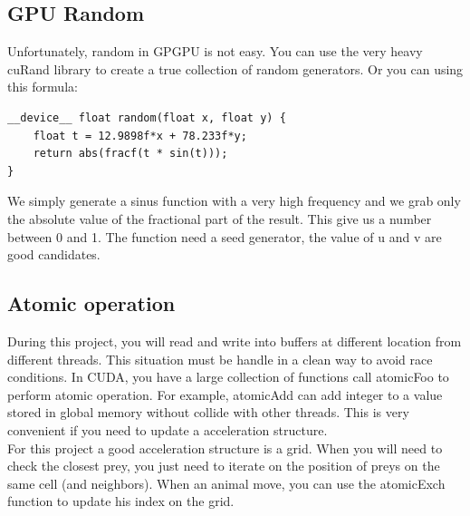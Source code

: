 \documentclass{article}
\begin{document}
\subsection{GPU Random}
Unfortunately, random in GPGPU is not easy. You can use the very heavy cuRand library to create a true collection of random generators. Or you can using this formula:
\begin{lstlisting}
__device__ float random(float x, float y) {
	float t = 12.9898f*x + 78.233f*y;
	return abs(fracf(t * sin(t)));
}
\end{lstlisting}
We simply generate a sinus function with a very high frequency and we grab only the absolute value of the fractional part of the result. This give us a number between 0 and 1. The function need a seed generator, the value of u and v are good candidates.

\subsection{Atomic operation}
During this project, you will read and write into buffers at different location from different threads. This situation must be handle in a clean way to avoid race conditions. In CUDA, you have a large collection of functions call atomicFoo to perform atomic operation. For example, atomicAdd can add integer to a value stored in global memory without collide with other threads. This is very convenient if you need to update a acceleration structure.\\
For this project a good acceleration structure is a grid. When you will need to check the closest prey, you just need to iterate on the position of preys on the same cell (and neighbors). When an animal move, you can use the atomicExch function to update his index on the grid.
\end{document}
